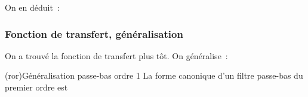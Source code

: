 \documentclass[../../main/main.tex]{subfiles}
\begin{document}
\begin{isd}[sidebyside align=top]
	\begin{minipage}[]{\linewidth}
		\centering
		\vspace{-15pt}
	\end{minipage}
	On en déduit~:
	\vspace{-15pt}
\end{isd}

\subsubsection{Fonction de transfert, généralisation}
On a trouvé la fonction de transfert plus tôt. On généralise~:
\begin{tcb*}(ror){Généralisation passe-bas ordre 1}
	La forme canonique d'un filtre passe-bas du premier ordre est
	\psw{
		\[
			\boxed{\Hu(x) = \frac{H_0}{1+\jx}}
			\qav
			x = \frac{\w}{\w_c}
			\qet
			H_0 = \cte
		\]
	}
	\vspace{-15pt}
\end{tcb*}
\end{document}
